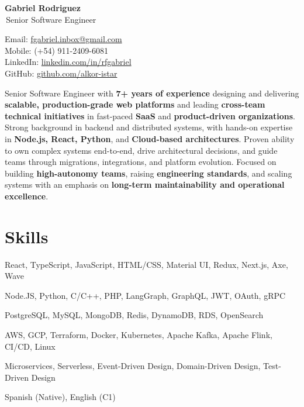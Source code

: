 \documentclass[11pt]{article} %
\begin{document}
\begin{center}
    \begin{minipage}{0.5\textwidth}
        {\Huge\bfseries
            \textcolor{cvtheme}{Gabriel Rodriguez} %
        } \\ \medskip
        {\Large\,Senior Software Engineer} %
    \end{minipage} \hfill
    \begin{minipage}{0.4\textwidth}
        \raggedleft
        Email: \href{fgabriel.inbox@gmail.com}{fgabriel.inbox@gmail.com} \\
        Mobile: (+54) 911-2409-6081 \\
        LinkedIn: \href{https://www.linkedin.com/in/rfgabriel}{linkedin.com/in/rfgabriel}\\
        GitHub: \href{https://github.com/alkor-istar}{github.com/alkor-istar}
    \end{minipage}
\end{center}

\begin{justify}
    Senior Software Engineer with \textbf{7+ years of experience} designing and delivering
    \textbf{scalable, production-grade web platforms} and leading
    \textbf{cross-team technical initiatives} in fast-paced
    \textbf{SaaS} and \textbf{product-driven organizations}.
    Strong background in backend and distributed systems, with hands-on expertise in
    \textbf{Node.js, React, Python}, and \textbf{Cloud-based architectures}.
    Proven ability to own complex systems end-to-end, drive
    architectural decisions, and guide teams through
    migrations, integrations, and platform evolution.
    Focused on building \textbf{high-autonomy teams}, raising
    \textbf{engineering standards}, and scaling systems with an emphasis on
    \textbf{long-term maintainability and operational excellence}.
\end{justify}

\section{Skills}
\begin{description}[itemsep=0pt]
    \item[{Frontend: }] {React, TypeScript, JavaScript, HTML/CSS, Material UI, Redux, Next.js, Axe, Wave}
    \item[{Backend: }] {Node.JS, Python, C/C++, PHP, LangGraph,  GraphQL, JWT, OAuth, gRPC}
    \item[{Databases: }] {PostgreSQL, MySQL, MongoDB, Redis, DynamoDB, RDS, OpenSearch}
    \item[{Cloud \& DevOps: }] {AWS, GCP, Terraform, Docker, Kubernetes, Apache Kafka, Apache Flink, CI/CD, Linux}
    \item[{Architectures: }] {Microservices, Serverless, Event-Driven Design, Domain-Driven Design, Test-Driven Design}
    \item[{Languages: }] {Spanish (Native), English (C1)}
\end{description}
\end{document}
